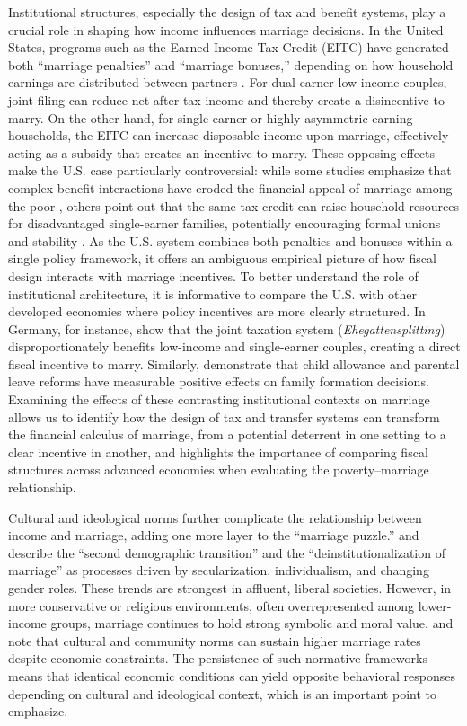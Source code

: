 Institutional structures, especially the design of tax and benefit systems, play a crucial role in shaping how income influences marriage decisions. In the United States, programs such as the Earned Income Tax Credit (EITC) have generated both ``marriage penalties'' and ``marriage bonuses,'' depending on how household earnings are distributed between partners \citep{EissaHoynes2004}. For dual-earner low-income couples, joint filing can reduce net after-tax income and thereby create a disincentive to marry. On the other hand, for single-earner or highly asymmetric-earning households, the EITC can increase disposable income upon marriage, effectively acting as a subsidy that creates an incentive to marry. These opposing effects make the U.S. case particularly controversial: while some studies emphasize that complex benefit interactions have eroded the financial appeal of marriage among the poor \citep{EllwoodJencks2004}, others point out that the same tax credit can raise household resources for disadvantaged single-earner families, potentially encouraging formal unions and stability \citep{Hoynes2015, Michelmore2018}. As the U.S. system combines both penalties and bonuses within a single policy framework, it offers an ambiguous empirical picture of how fiscal design interacts with marriage incentives. To better understand the role of institutional architecture, it is informative to compare the U.S. with other developed economies where policy incentives are more clearly structured. In Germany, for instance, \citet{Steiner2011} show that the joint taxation system (\textit{Ehegattensplitting}) disproportionately benefits low-income and single-earner couples, creating a direct fiscal incentive to marry. Similarly, \citet{DoepkeKindermann2019} demonstrate that child allowance and parental leave reforms have measurable positive effects on family formation decisions. Examining the effects of these contrasting institutional contexts on marriage allows us to identify how the design of tax and transfer systems can transform the financial calculus of marriage, from a potential deterrent in one setting to a clear incentive in another, and highlights the importance of comparing fiscal structures across advanced economies when evaluating the poverty–marriage relationship.

Cultural and ideological norms further complicate the relationship between income and marriage, adding one more layer to the ``marriage puzzle.'' \citet{Lesthaeghe2010, Lesthaeghe2014} and \citet{Cherlin2004} describe the ``second demographic transition'' and the ``deinstitutionalization of marriage'' as processes driven by secularization, individualism, and changing gender roles. These trends are strongest in affluent, liberal societies. However, in more conservative or religious environments, often overrepresented among lower-income groups, marriage continues to hold strong symbolic and moral value. \citet{GlaeserSacerdote2007} and \citet{McLanahanPercheski2008} note that cultural and community norms can sustain higher marriage rates despite economic constraints. The persistence of such normative frameworks means that identical economic conditions can yield opposite behavioral responses depending on cultural and ideological context, which is an important point to emphasize. 


